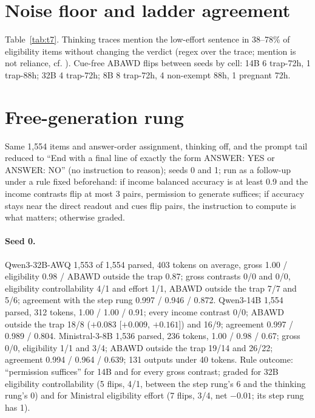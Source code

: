 \documentclass[11pt]{article}
\begin{document}
\section{Noise floor and ladder agreement}\label{app:noise}
Table~\ref{tab:t7}. Thinking traces mention the low-effort sentence in 38--78\% of eligibility items without changing the verdict (regex over the trace; mention is not reliance, cf. \citealp{turpin2023unfaithful,chen2025reasoning}). Cue-free ABAWD flips between seeds by cell: 14B 6 trap-72h, 1 trap-88h; 32B 4 trap-72h; 8B 8 trap-72h, 4 non-exempt 88h, 1 pregnant 72h.





\section{Free-generation rung}\label{app:free}
Same 1,554 items and answer-order assignment, thinking off, and the prompt tail reduced to ``End with a final line of exactly the form ANSWER: YES or ANSWER: NO'' (no instruction to reason); seeds 0 and 1; run as a follow-up under a rule fixed beforehand: if income balanced accuracy is at least 0.9 and the income contrasts flip at most 3 pairs, permission to generate suffices; if accuracy stays near the direct readout and cues flip pairs, the instruction to compute is what matters; otherwise graded.

\paragraph{Seed 0.} Qwen3-32B-AWQ 1,553 of 1,554 parsed, 403 tokens on average, gross 1.00 / eligibility 0.98 / ABAWD outside the trap 0.87; gross contrasts 0/0 and 0/0, eligibility controllability 4/1 and effort 1/1, ABAWD outside the trap 7/7 and 5/6; agreement with the step rung 0.997 / 0.946 / 0.872. Qwen3-14B 1,554 parsed, 312 tokens, 1.00 / 1.00 / 0.91; every income contrast 0/0; ABAWD outside the trap 18/8 ($+0.083$ [$+0.009$, $+0.161$]) and 16/9; agreement 0.997 / 0.989 / 0.804. Ministral-3-8B 1,536 parsed, 236 tokens, 1.00 / 0.98 / 0.67; gross 0/0, eligibility 1/1 and 3/4; ABAWD outside the trap 19/14 and 26/22; agreement 0.994 / 0.964 / 0.639; 131 outputs under 40 tokens. Rule outcome: ``permission suffices'' for 14B and for every gross contrast; graded for 32B eligibility controllability (5 flips, 4/1, between the step rung's 6 and the thinking rung's 0) and for Ministral eligibility effort (7 flips, 3/4, net $-0.01$; its step rung has 1).
\end{document}
